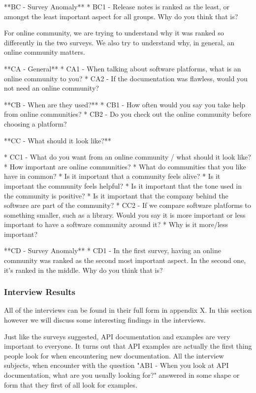 \documentclass[11pt]{article}
\begin{document}
\begin{multicols}{2}
{    **BC - Survey Anomaly**
    * BC1 - Release notes is ranked as the least, or amongst the least important aspect for all groups. Why do you think that is?



    For online community, we are trying to understand why it was ranked
    so differently in the two surveys. We also try to understand why, in general,
    an online community matters.

    **CA - General**
    *	CA1 - When talking about software platforms, what is an online community to you?
    *	CA2 - If the documentation was flawless, would you not need an online community?

    **CB - When are they used?**
    *	CB1 - How often would you say you take help from online communities?
    *   CB2 - Do you check out the online community before choosing a platform?

    **CC - What should it look like?**

    *	CC1 - What do you want from an online community / what should it look like?
    * How important are online communities?
    * What do communities that you like have in common?
    * Is it important that a community feels alive?
    * Is it important the community feels helpful?
    * Is it important that the tone used in the community is positive?
    * Is it important that the company behind the software are part of the community?
    *	CC2 - If we compare software platforms to something smaller, such as a library. Would you say it is more important or less important to have a software community around it?
    *	Why is it more/less important?

    **CD - Survey Anomaly**
    * CD1 - In the first survey, having an online community was ranked as the second most important aspect. In the second one, it’s ranked in the middle. Why do you think that is?

    \subsubsection{Interview Results}

    All of the interviews can be found in their full form in appendix X. In this section however
    we will discuss some interesting findings in the interviews.


    Just like the surveys suggested, API documentation and examples are very important
    to everyone. It turns out that API examples are actually the first thing people
    look for when encountering new documentation. All the interview subjects, when
    encounter with the question "AB1 - When you look at API documentation, what are you usually looking for?"
    answered in some shape or form that they first of all look for examples.

}
\end{multicols}
\end{document}
